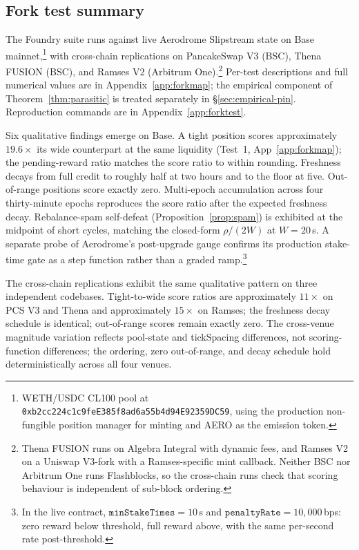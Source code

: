 \documentclass[11pt,a4paper]{article}
\theoremstyle{definition}
\theoremstyle{plain}
\theoremstyle{remark}
\begin{document}
\subsection{Fork test summary}\label{sec:testmap}

The Foundry suite runs against live Aerodrome Slipstream state on Base mainnet,\footnote{WETH/USDC CL100 pool at \texttt{0xb2cc224c1c9feE385f8ad6a55b4d94E92359DC59}, using the production non-fungible position manager for minting and AERO as the emission token.} with cross-chain replications on PancakeSwap V3 (BSC), Thena FUSION (BSC), and Ramses V2 (Arbitrum One).\footnote{Thena FUSION runs on Algebra Integral with dynamic fees, and Ramses V2 on a Uniswap V3-fork with a Ramses-specific mint callback. Neither BSC nor Arbitrum One runs Flashblocks, so the cross-chain runs check that scoring behaviour is independent of sub-block ordering.} Per-test descriptions and full numerical values are in Appendix~\ref{app:forkmap}; the empirical component of Theorem~\ref{thm:parasitic} is treated separately in \S\ref{sec:empirical-pin}. Reproduction commands are in Appendix~\ref{app:forktest}.

Six qualitative findings emerge on Base. A tight position scores approximately $19.6\times$ its wide counterpart at the same liquidity (Test~1, App~\ref{app:forkmap}); the pending-reward ratio matches the score ratio to within rounding. Freshness decays from full credit to roughly half at two hours and to the floor at five. Out-of-range positions score exactly zero. Multi-epoch accumulation across four thirty-minute epochs reproduces the score ratio after the expected freshness decay. Rebalance-spam self-defeat (Proposition~\ref{prop:spam}) is exhibited at the midpoint of short cycles, matching the closed-form $\rho/(2W)$ at $W = 20$\,s. A separate probe of Aerodrome's post-upgrade gauge confirms its production stake-time gate as a step function rather than a graded ramp.\footnote{In the live contract, $\texttt{minStakeTimes} = 10$\,s and $\texttt{penaltyRate} = 10{,}000$\,bps: zero reward below threshold, full reward above, with the same per-second rate post-threshold.}

The cross-chain replications exhibit the same qualitative pattern on three independent codebases. Tight-to-wide score ratios are approximately $11\times$ on PCS V3 and Thena and approximately $15\times$ on Ramses; the freshness decay schedule is identical; out-of-range scores remain exactly zero. The cross-venue magnitude variation reflects pool-state and tickSpacing differences, not scoring-function differences; the ordering, zero out-of-range, and decay schedule hold deterministically across all four venues.
\end{document}
